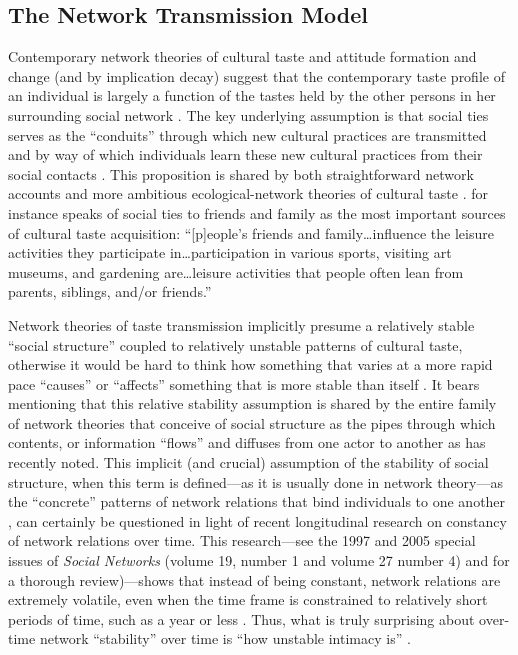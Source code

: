 \subsection{The Network Transmission Model}
\label{subsec:net}

Contemporary network theories of cultural taste and attitude formation and change (and by implication decay) suggest that the contemporary taste profile of an individual is largely a function of the tastes held by the other persons in her surrounding social network \citep{erickson82, erickson88}.  The key underlying assumption is that social ties serves as the ``conduits'' through which new cultural practices are transmitted and by way of which individuals learn these new cultural practices from their social contacts \citep{mark98a, carley91}.  This proposition is shared by both straightforward network accounts \citep[e.g.][]{cardon_granjon05, erickson96, kane04} and more ambitious ecological-network theories of cultural taste \citep{mark98a, mark03, mcpherson04}. \citet[323--324]{mark03}  for instance speaks of social ties to friends and family as the most important sources of cultural taste acquisition:  ``[p]eople's friends and family{\ldots}influence the leisure activities they participate in{\ldots}participation in various sports, visiting art museums, and gardening are{\ldots}leisure activities that people often lean from parents, siblings, and/or friends.''

Network theories of taste transmission implicitly presume a relatively stable ``social structure'' coupled to relatively unstable patterns of cultural taste, otherwise it would be hard to think how something that varies at a more rapid pace ``causes'' or ``affects'' something that is more stable than itself \citep{simon52}.  It bears mentioning that this relative stability assumption is shared by the entire family of network theories that conceive of social structure as the pipes through which contents, or information ``flows'' and diffuses from one actor to another as \citet{borgatti05} has recently noted.  This implicit (and crucial) assumption of the stability of social structure, when this term is defined---as it is usually done in network theory---as the ``concrete'' patterns of network relations that bind individuals to one another \citep{berkowitz82, berkowitz88, wellman83, wellman88, bearman97, breiger04}, can certainly be questioned in light of recent longitudinal research on constancy of network relations over time.  This research---see the 1997 and 2005 special issues of \textit{Social Networks} (volume 19, number 1 and volume 27 number 4) and \citet{burt00} for a thorough review)---shows that instead of being constant, network relations are extremely volatile, even when the time frame is constrained to relatively short periods of time, such as a year or less \citet{bidart_degenne05, suitor_etal97}. Thus, what is truly surprising about over-time network ``stability'' over time is ``how unstable intimacy is'' \citep[47]{wellman_etal97}.  

